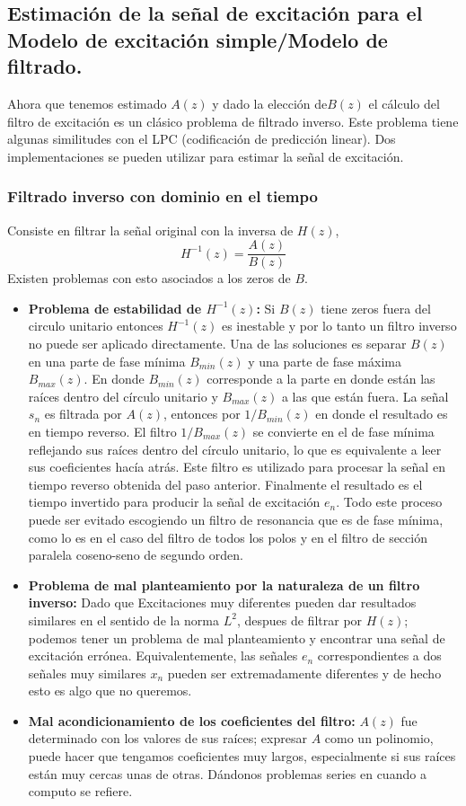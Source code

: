 \documentclass[11pt]{amsart}
\theoremstyle{plain}
\theoremstyle{definition}
\begin{document}
\subsection{Estimación de la señal de excitación para el Modelo de excitación simple/Modelo de filtrado.}
Ahora que tenemos estimado $A(z)$ y dado la elección de$B(z)$ el cálculo del filtro de excitación es un clásico problema de filtrado inverso. Este problema tiene algunas similitudes con el LPC (codificación de predicción linear). Dos implementaciones se pueden utilizar para estimar la señal de excitación.

\subsubsection{Filtrado inverso con dominio en el tiempo} Consiste en filtrar la señal original con la inversa de $H(z)$,
$$
H^{-1}(z)=\dfrac{A(z)}{B(z)}
$$
Existen problemas con esto asociados a los zeros de $B$. \\
\begin{itemize}
\item \textbf{Problema de estabilidad de $H^{-1}(z)$:} Si $B(z)$ tiene zeros fuera del circulo unitario entonces $H^{-1}(z)$ es inestable y por lo tanto un filtro inverso no puede ser aplicado directamente. Una de las soluciones es separar $B(z)$ en una parte de fase mínima $B_{min}(z)$ y una parte de fase máxima $B_{max}(z)$. En donde $B_{min}(z)$ corresponde a la parte en donde están las raíces dentro del círculo unitario y $B_{max}(z)$ a las que están fuera. La señal $s_n$ es filtrada por $A(z)$, entonces por $1/B_{min}(z)$ en donde el resultado es en tiempo reverso. El filtro $1/B_{max}(z)$ se convierte en el de fase mínima reflejando sus raíces dentro del círculo unitario, lo que es equivalente a leer sus coeficientes hacía atrás. Este filtro es utilizado para procesar la señal en tiempo reverso obtenida del paso anterior. Finalmente el resultado es el tiempo invertido para producir la señal de excitación $e_n$. Todo este proceso puede ser evitado escogiendo un filtro de resonancia que es de fase mínima, como lo es en el caso del filtro de todos los polos y en el filtro de sección paralela coseno-seno de segundo orden.
\item \textbf{Problema de mal planteamiento por la naturaleza de un filtro inverso:} Dado que Excitaciones muy diferentes pueden dar resultados similares en el sentido de la norma $L^2$, despues de filtrar por $H(z)$; podemos tener un problema de mal planteamiento  y encontrar una señal de excitación errónea. Equivalentemente, las señales $e_n$ correspondientes a dos señales muy similares $x_n$ pueden ser extremadamente diferentes y de hecho esto es algo que no queremos.
\item \textbf{Mal acondicionamiento de los coeficientes del filtro:} $A(z)$ fue determinado con los valores de sus raíces; expresar $A$ como un polinomio, puede hacer que tengamos coeficientes muy largos, especialmente si sus raíces están muy cercas unas de otras. Dándonos problemas series en cuando a computo se refiere.
\end{itemize}
\end{document}
